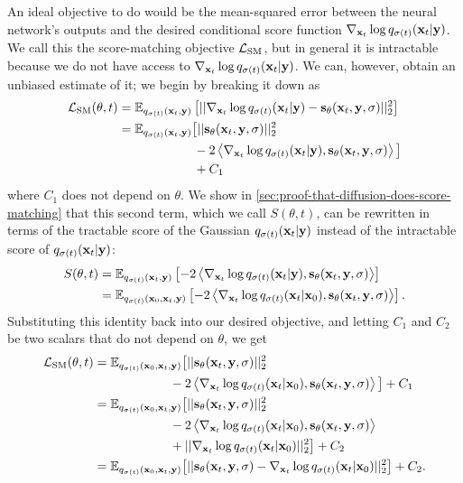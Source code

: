 An ideal objective to do would be the mean-squared error between the neural network's outputs and the desired conditional score function $\nabla_{{\mathbf{x}}_t} \log q_{\sigma(t)}({\mathbf{x}}_t|{\mathbf{y}})$. We call this the score-matching objective ${\mathcal{L}}_\text{SM}$, but in general it is intractable because we do not have access to $\nabla_{{\mathbf{x}}_t} \log q_{\sigma(t)}({\mathbf{x}}_t|{\mathbf{y}})$. We can, however, obtain an unbiased estimate of it; we begin by breaking it down as
\begin{align}
    \mathcal{L}_\text{SM}(\theta, t) &= \mathbb{E}_{q_{\sigma(t)}({\mathbf{x}}_t, {\mathbf{y}})} \left[ || \nabla_{{\mathbf{x}}_t} \log q_{\sigma(t)}({\mathbf{x}}_t|{\mathbf{y}}) - {\mathbf{s}}_\theta({\mathbf{x}}_t, {\mathbf{y}}, \sigma) ||_2^2 \right] \\
    &= \mathbb{E}_{q_{\sigma(t)}({\mathbf{x}}_t, {\mathbf{y}})} \big[ 
    || {\mathbf{s}}_\theta({\mathbf{x}}_t, {\mathbf{y}}, \sigma) ||_2^2
    \nonumber\\ &\qquad\qquad\qquad
    - 2 \left\langle \nabla_{{\mathbf{x}}_t} \log q_{\sigma(t)}({\mathbf{x}}_t|{\mathbf{y}}),
    {\mathbf{s}}_\theta({\mathbf{x}}_t, {\mathbf{y}}, \sigma) \right\rangle \big]
    \nonumber\\ &\qquad\qquad\qquad
    + C_1
\end{align}
where $C_1$ does not depend on $\theta$. We show in \cref{sec:proof-that-diffusion-does-score-matching} that this second term, which we call $S(\theta, t)$, can be rewritten in terms of the tractable score of the Gaussian $q_{\sigma(t)}({\mathbf{x}}_t|{\mathbf{y}})$ instead of the intractable score of $q_{\sigma(t)}({\mathbf{x}}_t|{\mathbf{y}})$:
\begin{align}
\allowdisplaybreaks
S(\theta, t) &= \EX_{q_{\sigma(t)}(\rvx_t, \rvy)} \left[ - 2 \left\langle \nabla_{\rvx_t} \log q_{\sigma(t)}(\rvx_t|\rvy), \rvs_\theta(\rvx_t, \rvy, \sigma) \right\rangle \right] \\
    &= \EX_{q_{\sigma(t)}(\rvx_0, \rvx_t, \rvy)} \left[ -2 \left\langle \nabla_{\rvx_t} \log q_{\sigma(t)}(\rvx_t|\rvx_0), \rvs_\theta(\rvx_t, \rvy, \sigma) \right\rangle  \right].
\end{align}
Substituting this identity back into our desired objective, and letting $C_1$ and $C_2$ be two scalars that do not depend on $\theta$, we get
\begin{align}
    \mathcal{L}_\text{SM}(\theta, t) &= \mathbb{E}_{q_{\sigma(t)}({\mathbf{x}}_0, {\mathbf{x}}_t, {\mathbf{y}})} \big[ 
    || {\mathbf{s}}_\theta({\mathbf{x}}_t, {\mathbf{y}}, \sigma) ||_2^2
    \nonumber\\ &\qquad\qquad\qquad
    - 2 \left\langle \nabla_{{\mathbf{x}}_t} \log q_{\sigma(t)}({\mathbf{x}}_t|{\mathbf{x}}_0), {\mathbf{s}}_\theta({\mathbf{x}}_t, {\mathbf{y}}, \sigma) \right\rangle \big] + C_1 \\
    &= \mathbb{E}_{q_{\sigma(t)}({\mathbf{x}}_0, {\mathbf{x}}_t, {\mathbf{y}})} \big[ 
    || {\mathbf{s}}_\theta({\mathbf{x}}_t, {\mathbf{y}}, \sigma) ||_2^2
    \nonumber\\ &\qquad\qquad\qquad
    - 2 \left\langle \nabla_{{\mathbf{x}}_t} \log q_{\sigma(t)}({\mathbf{x}}_t|{\mathbf{x}}_0), {\mathbf{s}}_\theta({\mathbf{x}}_t, {\mathbf{y}}, \sigma) \right\rangle
    \nonumber\\ &\qquad\qquad\qquad
    + || \nabla_{{\mathbf{x}}_t} \log q_{\sigma(t)}({\mathbf{x}}_t|{\mathbf{x}}_0) ||_2^2 \big] + C_2 \\
    &= \mathbb{E}_{q_{\sigma(t)}({\mathbf{x}}_0, {\mathbf{x}}_t, {\mathbf{y}})} \big[ 
    || {\mathbf{s}}_\theta({\mathbf{x}}_t, {\mathbf{y}}, \sigma) - \nabla_{{\mathbf{x}}_t} \log q_{\sigma(t)}({\mathbf{x}}_t|{\mathbf{x}}_0) ||_2^2 \big] + C_2.
\end{align}
